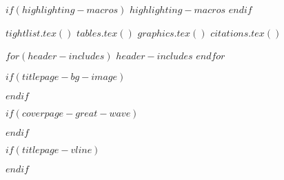 $if(highlighting-macros)$
$highlighting-macros$
$endif$

$tightlist.tex()$
$tables.tex()$
$graphics.tex()$
$citations.tex()$

$for(header-includes)$
$header-includes$
$endfor$

\usepackage[utf8]{inputenc} %
\usepackage[T1]{fontenc} %
\usepackage{babel}

$if(titlepage-bg-image)$
\usepackage{hyphenat}
\usepackage{graphicx}
\usepackage{wallpaper} %
\usepackage{geometry}
$endif$

$if(coverpage-great-wave)$
\usepackage{hyphenat}
\usepackage{graphicx}
\usepackage{geometry}
\usepackage{afterpage}
\usepackage{tikz}
\usetikzlibrary{fadings}
\usepackage[pagecolor=none]{pagecolor}
$endif$

$if(titlepage-vline)$
\usepackage{hyphenat}
\usepackage{graphicx}
$endif$
